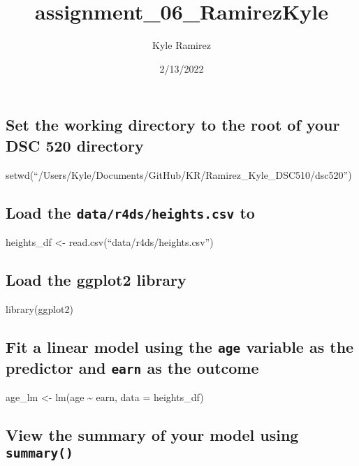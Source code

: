 \documentclass[
]{article}
\title{assignment\_06\_RamirezKyle}
\author{Kyle Ramirez}
\date{2/13/2022}
\begin{document}
\maketitle

\hypertarget{set-the-working-directory-to-the-root-of-your-dsc-520-directory}{%
\subsection{Set the working directory to the root of your DSC 520
directory}\label{set-the-working-directory-to-the-root-of-your-dsc-520-directory}}

setwd(``/Users/Kyle/Documents/GitHub/KR/Ramirez\_Kyle\_DSC510/dsc520'')

\hypertarget{load-the-datar4dsheights.csv-to}{%
\subsection{\texorpdfstring{Load the \texttt{data/r4ds/heights.csv}
to}{Load the data/r4ds/heights.csv to}}\label{load-the-datar4dsheights.csv-to}}

heights\_df \textless- read.csv(``data/r4ds/heights.csv'')

\hypertarget{load-the-ggplot2-library}{%
\subsection{Load the ggplot2 library}\label{load-the-ggplot2-library}}

library(ggplot2)

\hypertarget{fit-a-linear-model-using-the-age-variable-as-the-predictor-and-earn-as-the-outcome}{%
\subsection{\texorpdfstring{Fit a linear model using the \texttt{age}
variable as the predictor and \texttt{earn} as the
outcome}{Fit a linear model using the age variable as the predictor and earn as the outcome}}\label{fit-a-linear-model-using-the-age-variable-as-the-predictor-and-earn-as-the-outcome}}

age\_lm \textless- lm(age \textasciitilde{} earn, data = heights\_df)

\hypertarget{view-the-summary-of-your-model-using-summary}{%
\subsection{\texorpdfstring{View the summary of your model using
\texttt{summary()}}{View the summary of your model using summary()}}\label{view-the-summary-of-your-model-using-summary}}
\end{document}

